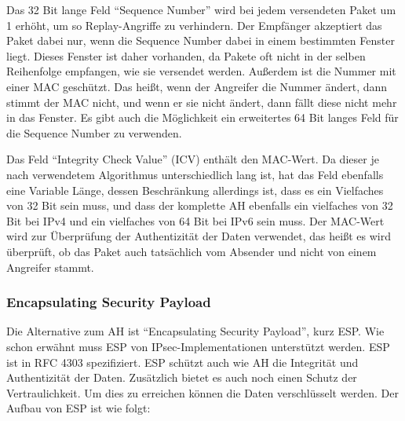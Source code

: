\documentclass[12pt]{scrartcl}
\begin{document}
Das 32 Bit lange Feld "`Sequence Number"' wird bei jedem versendeten Paket um 1 erhöht, um so Replay-Angriffe zu verhindern. Der Empfänger akzeptiert das Paket dabei nur, wenn die Sequence Number dabei in einem bestimmten Fenster liegt. Dieses Fenster ist daher vorhanden, da Pakete oft nicht in der selben Reihenfolge empfangen, wie sie versendet werden. Außerdem ist die Nummer mit einer MAC geschützt. Das heißt, wenn der Angreifer die Nummer ändert, dann stimmt der MAC nicht, und wenn er sie nicht ändert, dann fällt diese nicht mehr in das Fenster. Es gibt auch die Möglichkeit ein erweitertes 64 Bit langes Feld für die Sequence Number zu verwenden. 

Das Feld "`Integrity Check Value"' (ICV) enthält den MAC-Wert. Da dieser je nach verwendetem Algorithmus unterschiedlich lang ist, hat das Feld ebenfalls eine Variable Länge, dessen Beschränkung allerdings ist, dass es ein Vielfaches von 32 Bit sein muss, und dass der komplette AH ebenfalls ein vielfaches von 32 Bit bei IPv4 und ein vielfaches von 64 Bit bei IPv6 sein muss. Der MAC-Wert wird zur Überprüfung der Authentizität der Daten verwendet, das heißt es wird überprüft, ob das Paket auch tatsächlich vom Absender und nicht von einem Angreifer stammt.

\subsubsection{Encapsulating Security Payload}
Die Alternative zum AH ist "`Encapsulating Security Payload"', kurz ESP. Wie schon erwähnt muss ESP von IPsec-Implementationen unterstützt werden. ESP ist in RFC 4303 spezifiziert.\cite{RFC4303}
ESP schützt auch wie AH die Integrität und Authentizität der Daten. Zusätzlich bietet es auch noch einen Schutz der Vertraulichkeit. Um dies zu erreichen können die Daten verschlüsselt werden. Der Aufbau von ESP ist wie folgt:
\end{document}
